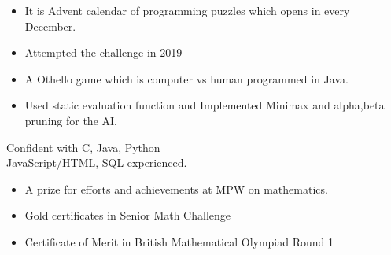 \vspace{-3mm}
\divider
\vspace{-3mm}


\begin{itemize}

\item It is Advent calendar of programming puzzles which opens in every December.
\item Attempted the challenge in 2019

\end{itemize}


\vspace{-3mm}
\divider
\vspace{-3mm}


\begin{itemize}

\item A Othello game which is computer vs human programmed in Java.
\item Used static evaluation function and Implemented Minimax and alpha,beta pruning for the AI.

\end{itemize}


\vspace{-3mm}
\smallskip
{}
Confident with C, Java, Python \\
JavaScript/HTML, SQL experienced.





\begin{itemize}
\item A prize for efforts and achievements at MPW on mathematics.
\end{itemize} 


\vspace{-3mm}
\divider
\vspace{-3mm}



\begin{itemize}

\item Gold certificates in Senior Math Challenge
\item Certificate of Merit in British Mathematical Olympiad Round 1

\end{itemize} 

